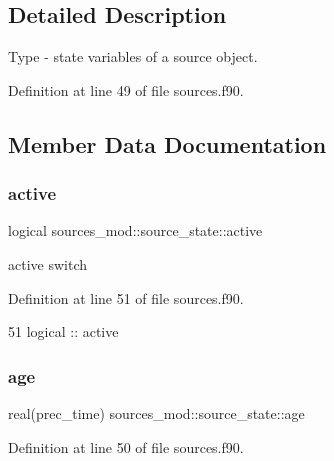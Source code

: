 \subsection{Detailed Description}
Type -\/ state variables of a source object. 

Definition at line 49 of file sources.\+f90.



\subsection{Member Data Documentation}
\mbox{\label{structsources__mod_1_1source__state_ab31d51c870b76a1e4ca9b03f5847a7c2}} 
\subsubsection{\texorpdfstring{active}{active}}
{\footnotesize\ttfamily logical sources\+\_\+mod\+::source\+\_\+state\+::active\hspace{0.3cm}{\ttfamily [private]}}



active switch 



Definition at line 51 of file sources.\+f90.


\begin{DoxyCode}
51         \textcolor{keywordtype}{logical} :: active
\end{DoxyCode}
\mbox{\label{structsources__mod_1_1source__state_a4ec18178b2bfbf4769892f26d62aa6f7}} 
\subsubsection{\texorpdfstring{age}{age}}
{\footnotesize\ttfamily real(prec\+\_\+time) sources\+\_\+mod\+::source\+\_\+state\+::age\hspace{0.3cm}{\ttfamily [private]}}



Definition at line 50 of file sources.\+f90.


